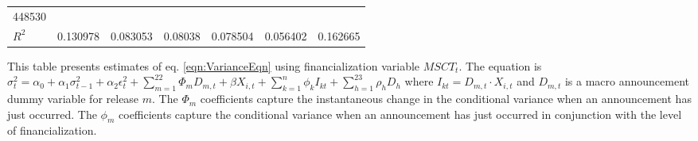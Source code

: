 \begin{sidewaystable}
{\begin{tabular}{@{}lllllllllllll@{}}
\multicolumn{2}{c}{ 448530 }                                                 \\ \textbf{$R^2$}             &\multicolumn{2}{c}{ 0.130978 }                                                 & \multicolumn{2}{c}{ 0.083053 }                                                 & \multicolumn{2}{c}{ 0.08038 }                                                 & \multicolumn{2}{c}{ 0.078504 }                                                 & \multicolumn{2}{c}{ 0.056402 }                                                   & \multicolumn{2}{c}{ 0.162665 }                                                 \\ \bottomrule 
\end{tabular}
}
\begin{tablenotes}\item 
        \singlespacing
        \footnotesize
        This table presents estimates of eq. \ref{eqn:VarianceEqn} using financialization variable $MSCT_t$. The equation is $\sigma_{t}^2=\alpha_0+\alpha_1 \sigma_{t-1}^2+\alpha_2 \epsilon_t^2 +\sum_{m=1}^{22} \Phi_m D_{m,t}+\beta X_{i,t}+\sum_{k=1}^n \phi_k I_{kt} + \sum_{h=1}^{23} \rho_h D_h$ where $I_{kt}=D_{m,t} \cdot X_{i,t}$ and $D_{m,t}$ is a macro announcement dummy variable for release $m$. The $\Phi_m$ coefficients capture the instantaneous change in the conditional variance when an announcement has just occurred. The $\phi_m$ coefficients capture the conditional variance when an announcement has just occurred in conjunction with the level of financialization.
\end{tablenotes}
\end{sidewaystable}

